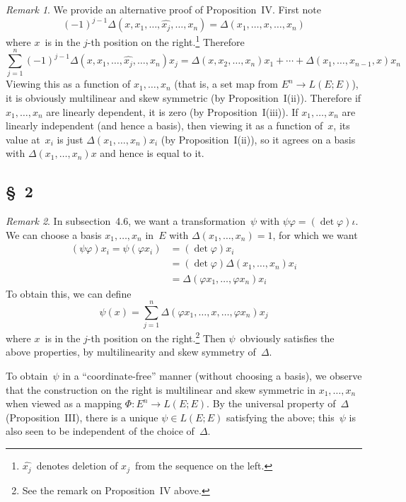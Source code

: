\documentclass[letterpaper,12pt]{article}
\newcommand{\delete}{\widehat}
\theoremstyle{definition}
\theoremstyle{remark}
\newtheorem*{rmk}{Remark}
\begin{document}
\begin{rmk}
We provide an alternative proof of Proposition~IV. First note
\[(-1)^{j-1}\Delta(x,x_1,\ldots,\delete{x_j},\ldots,x_n)=\Delta(x_1,\ldots,x,\ldots,x_n)\]
where \(x\)~is in the \(j\)-th position on the right.\footnote{\(\delete{x_j}\)~denotes deletion of \(x_j\)~from the sequence on the left.} Therefore
\[\sum_{j=1}^n(-1)^{j-1}\Delta(x,x_1,\ldots,\delete{x_j},\ldots,x_n)x_j=\Delta(x,x_2,\ldots,x_n)x_1+\cdots+\Delta(x_1,\ldots,x_{n-1},x)x_n\]
Viewing this as a function of \(x_1,\ldots,x_n\) (that is, a set map from \(E^n\to L(E;E)\)), it is obviously multilinear and skew symmetric (by Proposition~I(ii)). Therefore if \(x_1,\ldots,x_n\) are linearly dependent, it is zero (by Proposition~I(iii)). If \(x_1,\ldots,x_n\) are linearly independent (and hence a basis), then viewing it as a function of~\(x\), its value at~\(x_i\) is just \(\Delta(x_1,\ldots,x_n)x_i\) (by Proposition~I(ii)), so it agrees on a basis with \(\Delta(x_1,\ldots,x_n)x\) and hence is equal to it.
\end{rmk}


\subsection*{\S~2}
\begin{rmk}
In subsection~4.6, we want a transformation~\(\psi\) with \(\psi\varphi=(\det\varphi)\iota\). We can choose a basis \(x_1,\ldots,x_n\) in~\(E\) with \(\Delta(x_1,\ldots,x_n)=1\), for which we want
\begin{align*}
(\psi\varphi)x_i=\psi(\varphi x_i)&=(\det\varphi)x_i\\
	&=(\det\varphi)\Delta(x_1,\ldots,x_n)x_i\\
	&=\Delta(\varphi x_1,\ldots,\varphi x_n)x_i
\end{align*}
To obtain this, we can define
\[\psi(x)=\sum_{j=1}^n\Delta(\varphi x_1,\ldots,x,\ldots,\varphi x_n)x_j\]
where \(x\)~is in the \(j\)-th position on the right.\footnote{See the remark on Proposition~IV above.} Then \(\psi\)~obviously satisfies the above properties, by multilinearity and skew symmetry of~\(\Delta\).

To obtain~\(\psi\) in a ``coordinate-free''  manner (without choosing a basis), we observe that the construction on the right is multilinear and skew symmetric in \(x_1,\ldots,x_n\) when viewed as a mapping \(\Phi:E^n\to L(E;E)\). By the universal property of~\(\Delta\) (Proposition~III), there is a unique \(\psi\in L(E;E)\) satisfying the above; this~\(\psi\) is also seen to be independent of the choice of~\(\Delta\).
\end{rmk}
\end{document}
